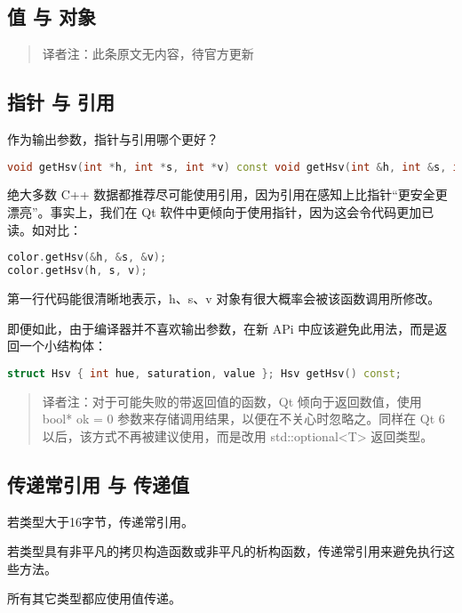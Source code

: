 \subsection{值 与 对象}

\begin{quote}
译者注：此条原文无内容，待官方更新
\end{quote}

\subsection{指针 与 引用}

作为输出参数，指针与引用哪个更好？

\begin{lstlisting}[language=C++]
void getHsv(int *h, int *s, int *v) const void getHsv(int &h, int &s, int &v) const
\end{lstlisting}

绝大多数 C++ 数据都推荐尽可能使用引用，因为引用在感知上比指针“更安全更漂亮”。事实上，我们在 Qt 软件中更倾向于使用指针，因为这会令代码更加已读。如对比：

\begin{lstlisting}[language=C++]
color.getHsv(&h, &s, &v);
color.getHsv(h, s, v);
\end{lstlisting}

第一行代码能很清晰地表示，h、s、v 对象有很大概率会被该函数调用所修改。

即便如此，由于编译器并不喜欢输出参数，在新 APi 中应该避免此用法，而是返回一个小结构体：

\begin{lstlisting}[language=C++]
struct Hsv { int hue, saturation, value }; Hsv getHsv() const;
\end{lstlisting}

\begin{quote}
	译者注：对于可能失败的带返回值的函数，Qt 倾向于返回数值，使用 bool* ok = 0 参数来存储调用结果，以便在不关心时忽略之。同样在 Qt 6 以后，该方式不再被建议使用，而是改用 std::optional<T> 返回类型。
\end{quote}

\subsection{传递常引用 与 传递值}
若类型大于16字节，传递常引用。

若类型具有非平凡的拷贝构造函数或非平凡的析构函数，传递常引用来避免执行这些方法。

所有其它类型都应使用值传递。

